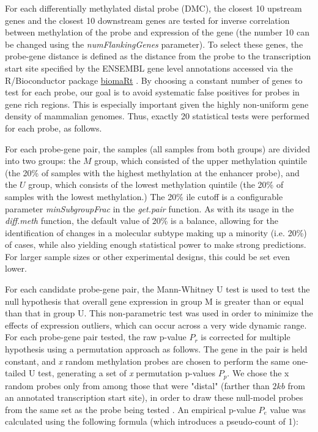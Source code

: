For each differentially methylated distal probe (DMC), the closest 10 upstream
genes and the closest 10 downstream genes are tested for inverse correlation between
methylation of the probe and expression of the gene (the number 10 can be changed using the \textit{numFlankingGenes} parameter). To select these genes,
the probe-gene distance is defined as the distance from the probe to the transcription
start site specified by the ENSEMBL gene level annotations \cite{yates2015ensembl} accessed via
the R/Bioconductor package \href{http://bioconductor.org/packages/biomaRt/}{biomaRt} \cite{durinck2009mapping,durinck2005biomart}. By choosing a constant number of genes to test for each probe, our goal is to avoid systematic false positives for probes in gene rich regions. This is especially important given the highly non-uniform gene density of mammalian genomes.
Thus, exactly 20 statistical tests were performed for each probe, as follows.

For each probe-gene pair, the samples (all samples from both groups) are divided into two
groups: the $M$ group, which consisted of the upper methylation quintile (the 20\%
of samples with the highest methylation at the enhancer probe), and the $U$ group,
which consists of the lowest methylation quintile (the 20\% of samples with the
lowest methylation.) The 20\% ile cutoff is a
configurable parameter \textit{minSubgroupFrac} in the \textit{get.pair} function.
As with its usage in the \textit{diff.meth} function, the default value of 20\% is
a balance, allowing for the identification of changes in a
molecular subtype making up a minority (i.e. 20\%) of cases, while also yielding
enough statistical power to make strong predictions. For larger sample sizes or
other experimental designs, this could be set even lower.

For each candidate probe-gene pair,
the Mann-Whitney U test is used to test the null hypothesis that overall gene
expression in group M is greater than or equal than that in group U.
This non-parametric test was used in order to minimize the effects
of expression outliers, which can  occur across a very wide dynamic range.
For each probe-gene pair tested, the raw p-value $P_r$ is corrected for multiple
hypothesis using a permutation approach as follows.
The gene in the pair is held constant, and \textit{x} random methylation probes are
chosen to perform the same one-tailed U test, generating a set of \textit{x} permutation
p-values $P_p$. We chose the x random probes only from among those that were
"distal" (farther than $2kb$ from an annotated transcription start site), in order
to draw these null-model probes from the same set as the probe being tested \cite{sham2014statistical}.
An empirical p-value $P_e$ value was calculated using the following formula
(which introduces a pseudo-count of 1):

